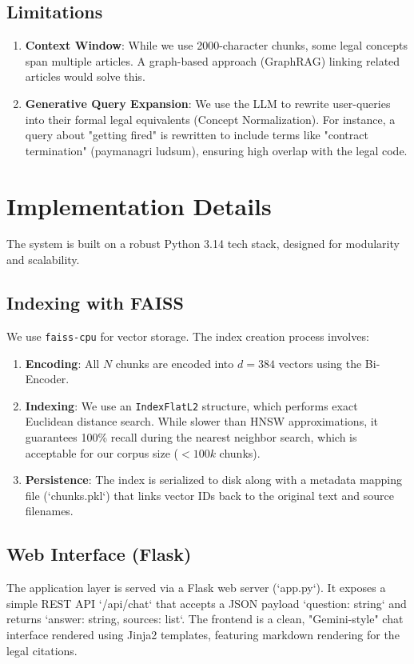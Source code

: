 \documentclass[11pt]{article}
\begin{document}
\subsection{Limitations}
\begin{enumerate}
    \item \textbf{Context Window}: While we use 2000-character chunks, some legal concepts span multiple articles. A graph-based approach (GraphRAG) linking related articles would solve this.
    \item \textbf{Generative Query Expansion}: We use the LLM to rewrite user-queries into their formal legal equivalents (Concept Normalization). For instance, a query about "getting fired" is rewritten to include terms like "contract termination" (paymanagri ludsum), ensuring high overlap with the legal code.
\end{enumerate}

\section{Implementation Details}
The system is built on a robust Python 3.14 tech stack, designed for modularity and scalability.

\subsection{Indexing with FAISS}
We use \texttt{faiss-cpu} for vector storage. The index creation process involves:
\begin{enumerate}
    \item \textbf{Encoding}: All $N$ chunks are encoded into $d=384$ vectors using the Bi-Encoder.
    \item \textbf{Indexing}: We use an \texttt{IndexFlatL2} structure, which performs exact Euclidean distance search. While slower than HNSW approximations, it guarantees 100\% recall during the nearest neighbor search, which is acceptable for our corpus size ($<100k$ chunks).
    \item \textbf{Persistence}: The index is serialized to disk along with a metadata mapping file (`chunks.pkl`) that links vector IDs back to the original text and source filenames.
\end{enumerate}

\subsection{Web Interface (Flask)}
The application layer is served via a Flask web server (`app.py`). It exposes a simple REST API `/api/chat` that accepts a JSON payload `{question: string}` and returns `{answer: string, sources: list}`. The frontend is a clean, "Gemini-style" chat interface rendered using Jinja2 templates, featuring markdown rendering for the legal citations.
\end{document}
